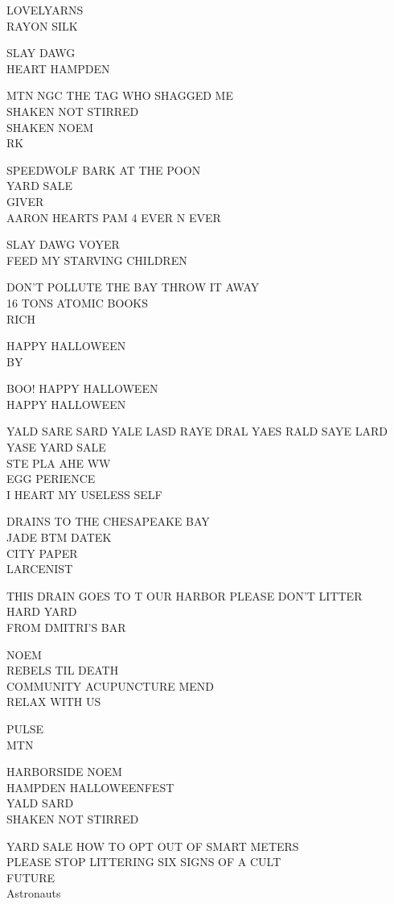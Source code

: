 \documentclass[10pt,letterpaper]{article}
\begin{document}
LOVELYARNS\\
RAYON SILK

SLAY DAWG\\
HEART HAMPDEN

MTN NGC THE TAG WHO SHAGGED ME\\
SHAKEN NOT STIRRED\\
SHAKEN NOEM\\
RK

SPEEDWOLF BARK AT THE POON\\
YARD SALE\\
GIVER\\
AARON HEARTS PAM 4 EVER N EVER

SLAY DAWG VOYER\\
FEED MY STARVING CHILDREN

DON'T POLLUTE THE BAY THROW IT AWAY\\
16 TONS ATOMIC BOOKS\\
RICH

HAPPY HALLOWEEN\\
BY

BOO! HAPPY HALLOWEEN\\
HAPPY HALLOWEEN

YALD SARE SARD YALE LASD RAYE DRAL YAES RALD SAYE LARD YASE YARD SALE\\
STE PLA AHE WW\\
EGG PERIENCE\\
I HEART MY USELESS SELF

DRAINS TO THE CHESAPEAKE BAY\\
JADE BTM DATEK\\
CITY PAPER\\
LARCENIST

THIS DRAIN GOES TO T OUR HARBOR PLEASE DON'T LITTER\\
HARD YARD\\
FROM DMITRI'S BAR

NOEM\\
REBELS TIL DEATH\\
COMMUNITY ACUPUNCTURE MEND\\
RELAX WITH US

PULSE\\
MTN

HARBORSIDE NOEM\\
HAMPDEN HALLOWEENFEST\\
YALD SARD\\
SHAKEN NOT STIRRED

YARD SALE HOW TO OPT OUT OF SMART METERS\\
PLEASE STOP LITTERING SIX SIGNS OF A CULT\\
FUTURE\\
Astronauts
\end{document}
